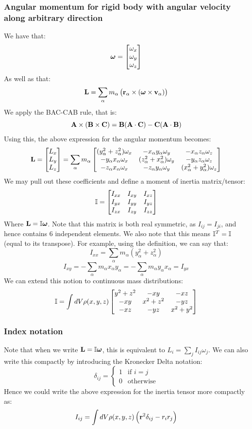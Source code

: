 \subsubsection{Angular momentum for rigid body with angular velocity along arbitrary direction}
We have that:
\[\bm{\omega} = \begin{bmatrix}\omega_x \\ \omega_y \\ \omega_z\end{bmatrix}\]
As well as that:
\[\mathbf{L} = \sum_\alpha m_\alpha \left(\mathbf{r}_\alpha \times (\bm{\omega} \times \mathbf{v}_\alpha)\right)\]
We apply the BAC-CAB rule, that is:
\[\mathbf{A} \times (\mathbf{B} \times \mathbf{C}) = \mathbf{B}(\mathbf{A} \cdot \mathbf{C}) - \mathbf{C}(\mathbf{A} \cdot \mathbf{B})\]
Using this, the above expression for the angular momentum becomes:
\[\mathbf{L} = \begin{bmatrix}L_x \\ L_y \\ L_z\end{bmatrix} = \sum_\alpha m_\alpha \begin{bmatrix}(y_\alpha^2 + z_\alpha^2)\omega_x & - x_\alpha y_\alpha \omega_y & -x_\alpha z_\alpha \omega_z
\\ -y_\alpha x_\alpha \omega_x & (z_\alpha^2 + x_\alpha^2)\omega_y & -y_\alpha z_\alpha \omega_z
\\ -z_\alpha x_\alpha \omega_x & -z_\alpha y_\alpha \omega_y & (x_\alpha^2 + y_\alpha^2)\omega_z\end{bmatrix}\]
We may pull out these coefficients and define a moment of inertia matrix/tensor:
\[\mathbb{I} = \begin{bmatrix}I_{xx} & I_{xy} & I_{xz} \\ I_{yx} & I_{yy} & I_{yz} \\ I_{zx} & I_{zy} & I_{zz}\end{bmatrix}\]
Where $\mathbf{L} = \mathbb{I}\bm{\omega}$. Note that this matrix is both real symmetric, as $I_{ij} = I_{ji}$, and hence contains 6 independent elements. We also note that this means $\mathbb{I}^T = \mathbb{I}$ (equal to its transpose). For example, using the definition, we can say that:
\[I_{xx} = \sum_\alpha m_\alpha(y_\alpha^2 + z_\alpha^2)\]
\[I_{xy} = -\sum_\alpha m_\alpha x_\alpha y_\alpha = -\sum_\alpha m_\alpha y_\alpha x_\alpha = I_{yx}\]
We can extend this notion to continuous mass distributions:
\[\mathbb{I} = \int dV\rho(x, y, z)\begin{bmatrix}y^2 + z^2 & -xy & -xz \\ -xy & x^2 + z^2 & -yz \\ -xz & -yz & x^2 + y^2
\end{bmatrix}\]
\subsubsection{Index notation}
Note that when we write $\mathbf{L} = \mathbb{I}\bm{\omega}$, this is equivalent to $L_i = \sum_j I_{ij}\omega_j$. We can also write this compactly by introducing the Kronecker Delta notation:
\[\delta_{ij} = \begin{cases}
1 & \text{if $i = j$}
\\ 0 & \text{otherwise}
\end{cases}\]
Hence we could write the above expression for the inertia tensor more compactly as:
\[I_{ij} = \int dV\rho(x,y,z)\left(\mathbf{r}^2\delta_{ij} - r_ir_j\right)\]


